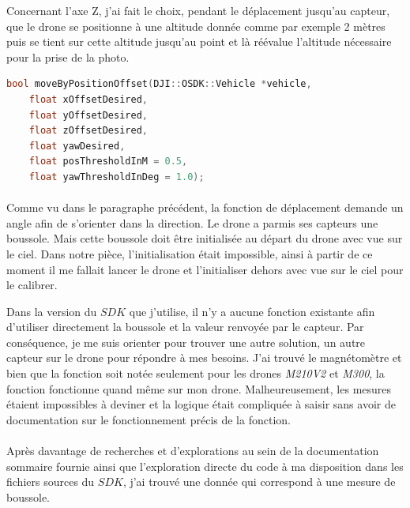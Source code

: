         Concernant l'axe Z, j'ai fait le choix, pendant le déplacement jusqu'au capteur, que le drone se positionne à une altitude donnée comme par exemple 2 mètres puis se tient sur cette altitude jusqu'au point et là réévalue l'altitude nécessaire pour la prise de la photo.
        
        \begin{lstlisting}[language=C++, caption=Fonction de déplacement du drone, label=code:moveDrone, aboveskip=1.7cm]
bool moveByPositionOffset(DJI::OSDK::Vehicle *vehicle,
    float xOffsetDesired,
    float yOffsetDesired,
    float zOffsetDesired,
    float yawDesired,
    float posThresholdInM = 0.5,
    float yawThresholdInDeg = 1.0);\end{lstlisting}
    
    
        \paragraph*{}
        Comme vu dans le paragraphe précédent, la fonction de déplacement demande un angle afin de s'orienter dans la direction. Le drone a parmis ses capteurs une boussole. Mais cette boussole doit être initialisée au départ du drone avec vue sur le ciel. Dans notre pièce, l'initialisation était impossible, ainsi à partir de ce moment il me fallait lancer le drone et l'initialiser dehors avec vue sur le ciel pour le calibrer.
        
        Dans la version du $SDK$ que j'utilise, il n'y a aucune fonction existante afin d'utiliser directement la boussole et la valeur renvoyée par le capteur. Par conséquence, je me suis orienter pour trouver une autre solution, un autre capteur sur le drone pour répondre à mes besoins. J'ai trouvé le magnétomètre et bien que la fonction soit notée seulement pour les drones \textit{M210V2} et \textit{M300}, la fonction fonctionne quand même sur mon drone. Malheureusement, les mesures étaient impossibles à deviner et la logique était compliquée à saisir sans avoir de documentation sur le fonctionnement précis de la fonction.
        
        \paragraph*{}
        Après davantage de recherches et d'explorations au sein de la documentation sommaire fournie ainsi que l'exploration directe du code à ma disposition dans les fichiers sources du $SDK$, j'ai trouvé une donnée qui correspond à une mesure de boussole.
        
